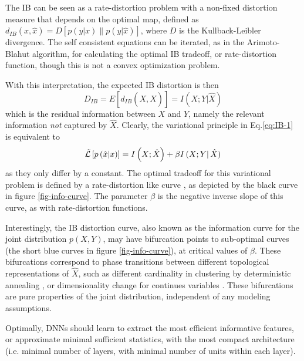 \documentclass[11pt]{article}
\newcommand{\ignore}[1]{}
\begin{document}
{The IB can be seen as a rate-distortion problem with a non-fixed distortion measure that depends on the
optimal map, defined as 
$d_{IB}\left(x,\hat{x}\right)=D\left[p\left(y|x\right)\|p\left(y|\hat{x}\right)\right]$,
where $D$ is the Kullback-Leibler divergence. The self consistent equations can be iterated, as in the Arimoto-Blahut
algorithm, for calculating the optimal IB tradeoff, or rate-distortion function, though this is not a convex
optimization problem.

With this interpretation, the expected IB distortion is then 
\[
D_{IB}=E\left[d_{IB}\left(X,\hat{X}\right)\right]=I(X;Y|\hat{X})
\]
which is the residual information between $X$ and $Y$, namely the
relevant information  {\em not} captured by $\hat{X}$.  
Clearly, the variational principle in Eq.\ref{eq:IB-1} is equivalent to
\[
\tilde{{\cal L}}\left[p\left(\hat{x}|x\right)\right]=I\left(X;\hat{X}\right)+\beta I\left(X;Y\right|\hat{X})
\]
as they only differ by a constant. The optimal tradeoff for this variational problem
is defined by a rate-distortion like curve \cite{Gilad-Bachrach03aninformation},
as depicted by the black curve in figure \ref{fig-info-curve}. The parameter $\beta$ is the negative inverse 
slope of this curve, as with rate-distortion functions.

\ignore{In addition, if the cardinality of $\hat{X}$ is smaller than the cardinality of $X$ [TODO: should it be only less than $|X|-2$?], then the best achievable tradeoff would be optimal only for sufficiently small $\beta$, which can be seen by the sub-optimal curves in figure \ref{fig-info-curve}.}

Interestingly, the IB distortion curve, also known as the information curve for the joint distribution $p(X,Y)$,
may have bifurcation points to sub-optimal curves (the short blue curves in figure \ref{fig-info-curve}), 
at critical values of $\beta$. These bifurcations correspond to phase transitions between different topological representations of $\hat{X}$, such as different cardinality in clustering 
by deterministic annealing \cite{KR-98}, or dimensionality change for continues variables \cite{GC-AG-NT-YW-2005}.  
These bifurcations are pure properties of the joint distribution, independent of any modeling assumptions.

Optimally, DNNs should learn to extract the most efficient informative features, or approximate 
minimal sufficient statistics, with the most compact architecture (i.e. minimal number of layers, 
with minimal number of units within each layer). 


}
\end{document}
